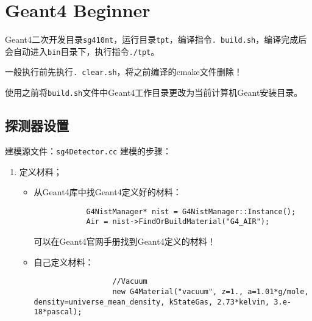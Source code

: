 \documentclass{article}
\begin{document}
\section{Geant4 Beginner}
Geant4二次开发目录\texttt{sg410mt}，运行目录\texttt{tpt}，编译指令\texttt{. build.sh}，编译完成后会自动进入\texttt{bin}目录下，执行指令\texttt{./tpt}。

一般执行前先执行\texttt{. clear.sh}，将之前编译的cmake文件删除！

使用之前将\texttt{build.sh}文件中Geant4工作目录更改为当前计算机Geant安装目录。

\subsection{探测器设置}
建模源文件：\texttt{sg4Detector.cc}
建模的步骤：
\begin{enumerate}
    \item 定义材料；
          \begin{itemize}
              \item 从Geant4库中找Geant4定义好的材料：
                    \begin{lstlisting}
            G4NistManager* nist = G4NistManager::Instance();
            Air = nist->FindOrBuildMaterial("G4_AIR");
        \end{lstlisting}
                    可以在Geant4官网手册找到Geant4定义的材料！
              \item 自己定义材料：
                    \begin{lstlisting}
                  //Vacuum
                  new G4Material("vacuum", z=1., a=1.01*g/mole, density=universe_mean_density, kStateGas, 2.73*kelvin, 3.e-18*pascal);


\end{lstlisting}
\end{itemize}
\end{enumerate}
\end{document}
